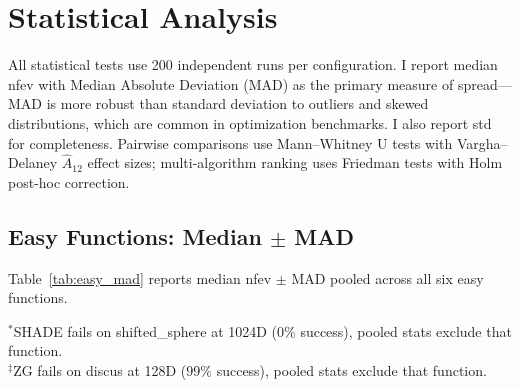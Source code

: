 \documentclass[11pt,a4paper]{article}
\begin{document}
\section{Statistical Analysis}

All statistical tests use 200 independent runs per configuration. I report median nfev with Median Absolute Deviation (MAD) as the primary measure of spread---MAD is more robust than standard deviation to outliers and skewed distributions, which are common in optimization benchmarks. I also report std for completeness. Pairwise comparisons use Mann--Whitney U tests with Vargha--Delaney $\hat{A}_{12}$ effect sizes; multi-algorithm ranking uses Friedman tests with Holm post-hoc correction.

\subsection{Easy Functions: Median $\pm$ MAD}

Table~\ref{tab:easy_mad} reports median nfev $\pm$ MAD pooled across all six easy functions.

\begin{table}[ht]
\centering
\caption{Easy functions: median nfev (MAD / std) pooled across 6 functions $\times$ 200 seeds.}
\label{tab:easy_mad}

\smallskip

\small $^*$SHADE fails on shifted\_sphere at 1024D (0\% success), pooled stats exclude that function. \\
$^\ddagger$ZG fails on discus at 128D (99\% success), pooled stats exclude that function.
\end{table}
\end{document}
